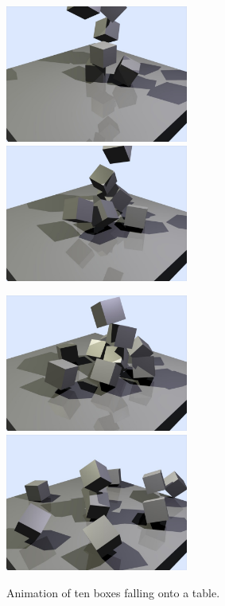 \begin{figure}
\centerline{\includegraphics[width=60mm,height=45mm]{figures/boxes1} \hspace{5mm}
            \includegraphics[width=60mm,height=45mm]{figures/boxes2}}\vspace{5mm}
\centerline{\includegraphics[width=60mm,height=45mm]{figures/boxes3} \hspace{5mm}
            \includegraphics[width=60mm,height=45mm]{figures/boxes4}}
\caption{Animation of ten boxes falling onto a table.\label{sampleBoxes}}
\end{figure}

